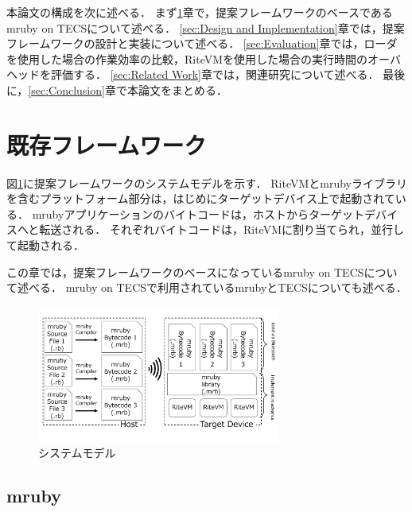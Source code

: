 \documentclass[submit,techrep]{ipsj}
\begin{document}
本論文の構成を次に述べる．
まず\ref{sec:Background}章で，提案フレームワークのベースであるmruby on TECSについて述べる．
\ref{sec:Design and Implementation}章では，提案フレームワークの設計と実装について述べる．
\ref{sec:Evaluation}章では，ローダを使用した場合の作業効率の比較，RiteVMを使用した場合の実行時間のオーバヘッドを評価する．
\ref{sec:Related Work}章では，関連研究について述べる．
最後に，\ref{sec:Conclusion}章で本論文をまとめる．


\section{既存フレームワーク}
\label{sec:Background}
図\ref{fig:proposed}に提案フレームワークのシステムモデルを示す．
RiteVMとmrubyライブラリを含むプラットフォーム部分は，はじめにターゲットデバイス上で起動されている．
mrubyアプリケーションのバイトコードは，ホストからターゲットデバイスへと転送される．
それぞれバイトコードは，RiteVMに割り当てられ，並行して起動される．

この章では，提案フレームワークのベースになっているmruby on TECSについて述べる．
mruby on TECSで利用されているmrubyとTECSについても述べる．

\begin{figure}[t]
    \centering
    \includegraphics[width=8cm,clip]{../EMSOFT2016/figure/proposed.pdf}
    \caption{システムモデル}
    \label{fig:proposed}
\end{figure}

\subsection{mruby}
\end{document}

